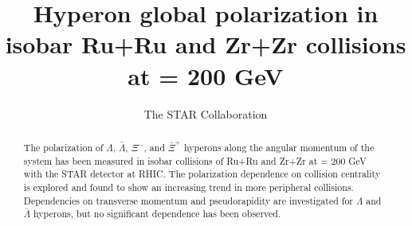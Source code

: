 \documentclass[preprint,5p,times,twocolumn]{elsarticle}
\begin{document}
\begin{frontmatter}


\title{Hyperon global polarization in isobar Ru+Ru and Zr+Zr collisions at \snn = 200 GeV}

\author{The STAR Collaboration}

\begin{abstract}
%
The polarization of $\Lambda$, $\bar{\Lambda}$, $\Xi^-$, and $\bar{\Xi}^+$ hyperons along the angular momentum of the system has been measured in isobar collisions of Ru+Ru and Zr+Zr at \snn = 200 GeV with the STAR detector at RHIC. 
The polarization dependence on collision centrality is explored and found to show an increasing trend in more peripheral collisions. 
Dependencies on transverse momentum and pseudorapidity are investigated for $\Lambda$ and $\bar{\Lambda}$ hyperons, but no significant dependence has been observed. 

\end{abstract}
\end{frontmatter}
\end{document}
